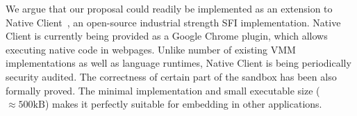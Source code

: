 We argue that our proposal could readily be implemented as an extension
to Native Client~\cite{yee:ieee-sp09}, an open-source industrial
strength SFI implementation. Native Client is currently being provided
as a Google Chrome plugin, which allows executing native code in
webpages. Unlike number of existing VMM implementations as well as
language runtimes, Native Client is being periodically security audited.
The correctness of certain part of the sandbox has been also formally
proved. The minimal implementation and small executable size
($\approx{}500\text{kB}$) makes it perfectly suitable for
embedding in other applications.









